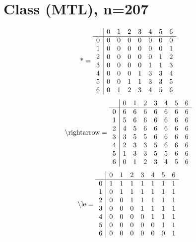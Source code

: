 \documentclass[11pt]{article}
\begin{document}
\section{Class (MTL), n=207}
\[\text{*} = 
\begin{array}{r | r r r r r r r}
 & 0 & 1 & 2 & 3 & 4 & 5 & 6 \\ \hline
0 & 0 & 0 & 0 & 0 & 0 & 0 & 0 \\
1 & 0 & 0 & 0 & 0 & 0 & 0 & 1 \\
2 & 0 & 0 & 0 & 0 & 0 & 1 & 2 \\
3 & 0 & 0 & 0 & 0 & 1 & 1 & 3 \\
4 & 0 & 0 & 0 & 1 & 3 & 3 & 4 \\
5 & 0 & 0 & 1 & 1 & 3 & 3 & 5 \\
6 & 0 & 1 & 2 & 3 & 4 & 5 & 6 \\
\end{array}
\]
\[\text{\textbackslash rightarrow} = 
\begin{array}{r | r r r r r r r}
 & 0 & 1 & 2 & 3 & 4 & 5 & 6 \\ \hline
0 & 6 & 6 & 6 & 6 & 6 & 6 & 6 \\
1 & 5 & 6 & 6 & 6 & 6 & 6 & 6 \\
2 & 4 & 5 & 6 & 6 & 6 & 6 & 6 \\
3 & 3 & 5 & 5 & 6 & 6 & 6 & 6 \\
4 & 2 & 3 & 3 & 5 & 6 & 6 & 6 \\
5 & 1 & 3 & 3 & 5 & 5 & 6 & 6 \\
6 & 0 & 1 & 2 & 3 & 4 & 5 & 6 \\
\end{array}
\]
\[\text{\textbackslash le} = 
\begin{array}{r | r r r r r r r}
 & 0 & 1 & 2 & 3 & 4 & 5 & 6 \\ \hline
0 & 1 & 1 & 1 & 1 & 1 & 1 & 1 \\
1 & 0 & 1 & 1 & 1 & 1 & 1 & 1 \\
2 & 0 & 0 & 1 & 1 & 1 & 1 & 1 \\
3 & 0 & 0 & 0 & 1 & 1 & 1 & 1 \\
4 & 0 & 0 & 0 & 0 & 1 & 1 & 1 \\
5 & 0 & 0 & 0 & 0 & 0 & 1 & 1 \\
6 & 0 & 0 & 0 & 0 & 0 & 0 & 1 \\
\end{array}
\]
\end{document}
